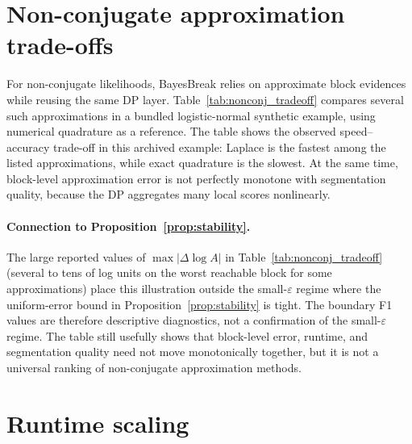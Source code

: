 \section{Non-conjugate approximation trade-offs}

For non-conjugate likelihoods, BayesBreak relies on approximate block evidences while reusing the
same DP layer. Table~\ref{tab:nonconj_tradeoff} compares several such approximations in a bundled
logistic-normal synthetic example, using numerical quadrature as a reference. The table shows the
observed speed--accuracy trade-off in this archived example: Laplace is the fastest among the listed approximations, while exact quadrature is the slowest. At the same time, block-level approximation error
is not perfectly monotone with segmentation quality, because the DP aggregates many local scores
nonlinearly.

\begin{table}[H]
    \centering
    
    \caption{Approximation trade-offs for a non-conjugate Bernoulli/logistic block model. Quadrature is used as the local reference block integral; the remaining methods trade block-level fidelity against computational cost.}
    \label{tab:nonconj_tradeoff}
\end{table}

\paragraph{Connection to Proposition~\ref{prop:stability}.}
The large reported values of $\max|\Delta\log A|$ in Table~\ref{tab:nonconj_tradeoff} (several to
tens of log units on the worst reachable block for some approximations) place this illustration outside the small-$\varepsilon$ regime where the uniform-error
bound in Proposition~\ref{prop:stability} is tight.
The boundary F1 values are therefore descriptive diagnostics, not a confirmation of the
small-$\varepsilon$ regime. The table still usefully shows that block-level error, runtime, and
segmentation quality need not move monotonically together, but it is not a universal ranking of
non-conjugate approximation methods.

\section{Runtime scaling}

